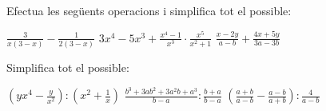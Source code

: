 \begin{activitats}
\begin{mylist}
\exer   Efectua les següents operacions i simplifica tot el possible:

\begin{tasks}
	\task  $\frac{3}{x(3-x)} -\frac{1}{2(3-x)} $   
	\task  $3x^{4} -5x^{3} +\frac{x^{4} -1}{x^{3} } \cdot \frac{x^{5} }{x^{2} +1} $   
	\task  $\frac{x-2y}{a-b} +\frac{4x+5y}{3a-3b} $
\end{tasks}


\exer  Simplifica tot el possible:

\begin{tasks}
 	\task  $\left(yx^{4} -\frac{y}{x^{2} } \right):\left(x^{2} +\frac{1}{x} \right)$   
	\task  $\frac{b^{3} +3ab^{2} +3a^{2} b+a^{3} }{b-a} :\frac{b+a}{b-a} $
	\task $\left(\frac{a+b}{a-b} -\frac{a-b}{a+b} \right):\frac{4}{a-b} $
\end{tasks}

\answers[cols=1]{[$\frac{y(x^3 -1)}{x}$, $(a+b)^2=a^2+2ab+b^2$, $\frac{ab}{a+b}$]}

 
\end{mylist}
 
\end{activitats}
 

 

